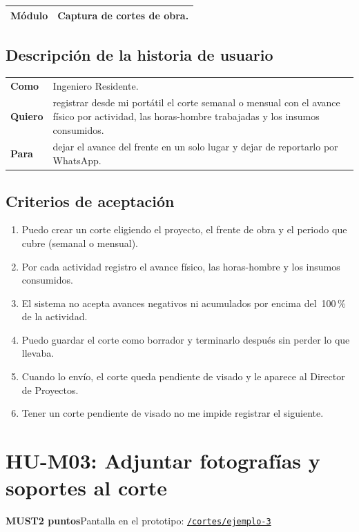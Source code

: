 \documentclass[11pt]{article}
\newcommand{\urlapp}{https://thankstochatgpt.github.io/LOARD}
\newcommand{\app}[1]{\href{\urlapp#1}{\texttt{#1}}}
\newcommand{\etiqueta}[1]{\colorbox{barra}{\textbf{\color{marca}#1}}}
\begin{document}
\begin{tabular}{>{\bfseries}p{2.4cm} p{13.4cm}}
\toprule
Módulo & Captura de cortes de obra. \\
\bottomrule
\end{tabular}

\subsection*{Descripción de la historia de usuario}

\begin{tabular}{>{\bfseries}p{2.4cm} p{13.4cm}}
\toprule
Como & Ingeniero Residente. \\
Quiero & registrar desde mi portátil el corte semanal o mensual con el avance físico por actividad, las horas-hombre trabajadas y los insumos consumidos. \\
Para & dejar el avance del frente en un solo lugar y dejar de reportarlo por WhatsApp. \\
\bottomrule
\end{tabular}

\subsection*{Criterios de aceptación}

\begin{enumerate}
\item Puedo crear un corte eligiendo el proyecto, el frente de obra y el periodo que cubre (semanal o mensual).
\item Por cada actividad registro el avance físico, las horas-hombre y los insumos consumidos.
\item El sistema no acepta avances negativos ni acumulados por encima del~100\,\% de la actividad.
\item Puedo guardar el corte como borrador y terminarlo después sin perder lo que llevaba.
\item Cuando lo envío, el corte queda pendiente de visado y le aparece al Director de Proyectos.
\item Tener un corte pendiente de visado no me impide registrar el siguiente.
\end{enumerate}


\newpage
\section*{HU-M03: Adjuntar fotografías y soportes al corte}
\etiqueta{MUST}\quad\etiqueta{2 puntos}\quad Pantalla en el prototipo: \app{/cortes/ejemplo-3}
\end{document}
